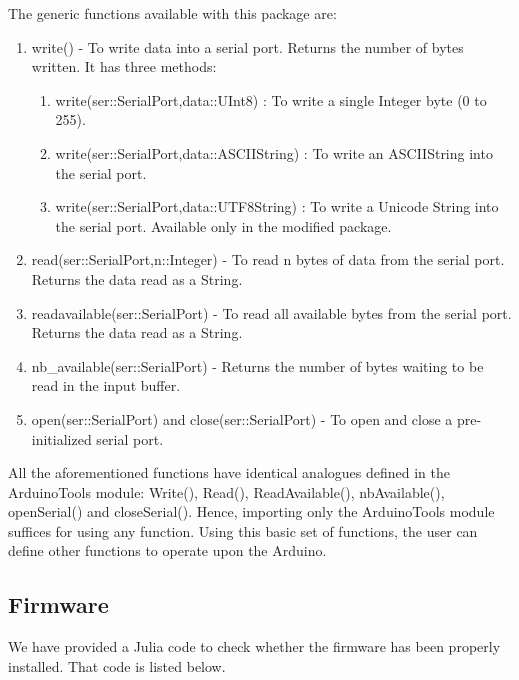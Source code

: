 The generic functions available with this package are:
\begin{enumerate}
      \item write() - To write data into a serial port. Returns the number of bytes written.
            It has three methods:
            \begin{enumerate}
                  \item write(ser::SerialPort,data::UInt8) :
                        To write a single Integer byte (0 to 255).
                  \item write(ser::SerialPort,data::ASCIIString) :
                        To write an ASCIIString into the serial port.
                  \item write(ser::SerialPort,data::UTF8String) :
                        To write a Unicode String into the serial port. Available only in the
                        modified package.
            \end{enumerate}
            
      \item read(ser::SerialPort,n::Integer) - To read n bytes of data from the serial
            port. Returns the data read as a String.
            
      \item readavailable(ser::SerialPort) - To read all available bytes from the serial
            port. Returns the data read as a String. 
            
      \item nb\_available(ser::SerialPort) - Returns the number of bytes waiting to be read
            in the input buffer.
            
      \item open(ser::SerialPort) and close(ser::SerialPort) - To open and close a
            pre-initialized serial port.   
            
\end{enumerate}

All the aforementioned functions have identical analogues defined in
the ArduinoTools module:  Write(), Read(), ReadAvailable(),
nbAvailable(), openSerial() and closeSerial(). Hence, importing only
the ArduinoTools module suffices for using any function. Using this
basic set of functions, the user can define other functions to operate
upon the Arduino.


\subsection{Firmware}
\lstset{style=mystyle}
\label{sec:test-firmware-julia}
We have provided a Julia code to check whether the firmware has been
properly installed.  That code is listed below.

